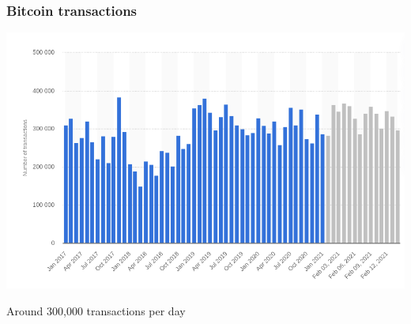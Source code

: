 \documentclass[11pt]{beamer}  %
\begin{document}
\begin{frame}\frametitle{Bitcoin transactions}

  \begin{center}
    \includegraphics[scale=0.3,clip=false]{pictures/bitcoin-daily.png}
  \end{center}

  \begin{center}
    Around 300,000 transactions per day
  \end{center}

\end{frame}
\end{document}
